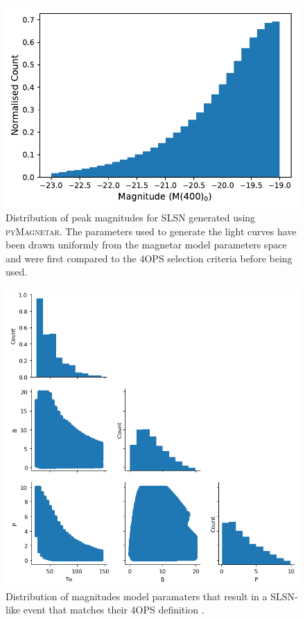 \begin{figure}
  \includegraphics[width=\textwidth]{Figures/Chapter5/MagDist}
  \caption{Distribution of peak magnitudes for SLSN generated using \textsc{pyMagnetar}. The parameters used to generate the light curves have been drawn uniformly from the magnetar model parameters space and were first compared to the 4OPS selection criteria before being used.}
  \label{fig:4OPSParams}
\end{figure}

\begin{figure}
  \includegraphics[width=\textwidth]{Figures/Chapter5/MagParams.png}
  \caption{Distribution of magnitudes model paramaters that result in a SLSN-like event that matches their 4OPS definition \citep{Inserra2018a}.}
  \label{fig:4OPSMag}
\end{figure}


